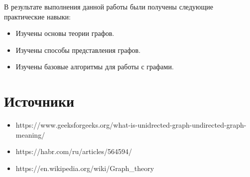 \documentclass[12pt]{article}
\begin{document}
В результате выполнения данной работы были получены следующие практические навыки:

\begin{itemize}
    \item Изучены основы теории графов.
    \item Изучены способы представления графов.
    \item Изучены базовые алгоритмы для работы с графами.
\end{itemize}

\section*{Источники}
\begin{itemize}
\item https://www.geeksforgeeks.org/what-is-unidrected-graph-undirected-graph-meaning/
\item https://habr.com/ru/articles/564594/
\item https://en.wikipedia.org/wiki/Graph_theory
\end{itemize}
\end{document}
